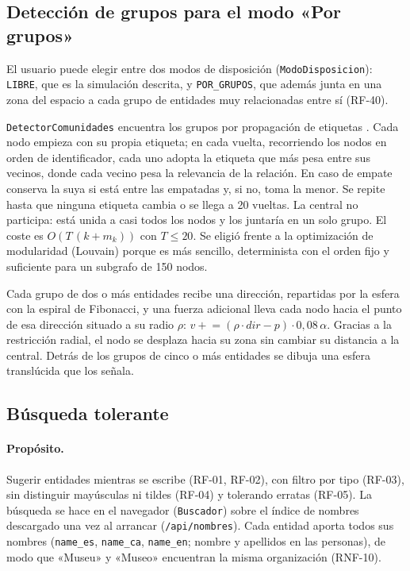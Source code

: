 \subsection{Detección de grupos para el modo «Por grupos»}
\label{sec:alg-grupos}

El usuario puede elegir entre dos modos de disposición (\texttt{ModoDisposicion}): \texttt{LIBRE}, que es la simulación descrita, y \texttt{POR\_GRUPOS}, que además junta en una zona del espacio a cada grupo de entidades muy relacionadas entre sí (RF-40).

\texttt{DetectorComunidades} encuentra los grupos por propagación de etiquetas \cite{TODO}. Cada nodo empieza con su propia etiqueta; en cada vuelta, recorriendo los nodos en orden de identificador, cada uno adopta la etiqueta que más pesa entre sus vecinos, donde cada vecino pesa la relevancia de la relación. En caso de empate conserva la suya si está entre las empatadas y, si no, toma la menor. Se repite hasta que ninguna etiqueta cambia o se llega a 20 vueltas. La central no participa: está unida a casi todos los nodos y los juntaría en un solo grupo. El coste es $O(T\,(k+m_k))$ con $T\le20$. Se eligió frente a la optimización de modularidad (Louvain) porque es más sencillo, determinista con el orden fijo y suficiente para un subgrafo de 150 nodos.

Cada grupo de dos o más entidades recibe una dirección, repartidas por la esfera con la espiral de Fibonacci, y una fuerza adicional lleva cada nodo hacia el punto de esa dirección situado a su radio $\rho$: $v \mathrel{+}= (\rho\cdot dir - p)\cdot0{,}08\,\alpha$. Gracias a la restricción radial, el nodo se desplaza hacia su zona sin cambiar su distancia a la central. Detrás de los grupos de cinco o más entidades se dibuja una esfera translúcida que los señala.

\subsection{Búsqueda tolerante}
\label{sec:alg-busqueda}

\paragraph{Propósito.} Sugerir entidades mientras se escribe (RF-01, RF-02), con filtro por tipo (RF-03), sin distinguir mayúsculas ni tildes (RF-04) y tolerando erratas (RF-05). La búsqueda se hace en el navegador (\texttt{Buscador}) sobre el índice de nombres descargado una vez al arrancar (\texttt{/api/nombres}). Cada entidad aporta todos sus nombres (\texttt{name\_es}, \texttt{name\_ca}, \texttt{name\_en}; nombre y apellidos en las personas), de modo que «Museu» y «Museo» encuentran la misma organización (RNF-10).


